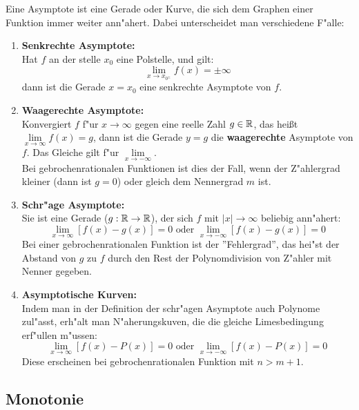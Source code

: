 \documentclass[main.tex]{subfiles}
\begin{document}
Eine Asymptote ist eine Gerade oder Kurve, die sich dem Graphen einer Funktion immer weiter ann"ahert. Dabei unterscheidet man verschiedene F"alle:\\
\begin{Definition}
\begin{enumerate}
	\item \textbf{Senkrechte Asymptote:}\\
	Hat $f$ an der stelle $x_{0}$ eine Polstelle, und gilt:
		$$\lim\limits_{x \rightarrow x_{0^{\pm}}} f(x) = \pm \infty$$
	dann ist die Gerade $x=x_{0}$ eine senkrechte Asymptote von $f$.

	\item \textbf{Waagerechte Asymptote:}\\
	Konvergiert $f$ f"ur $x\rightarrow \infty$ gegen eine reelle Zahl $g\in \mathbb{R}$, das heißt $\lim\limits_{x \rightarrow \infty }{f(x)}=g$, dann ist die Gerade $y=g$ die \textbf{waagerechte} Asymptote von $f$. Das Gleiche gilt f"ur $\lim\limits_{x \rightarrow -\infty}$.\\
	Bei gebrochenrationalen Funktionen ist dies der Fall, wenn der Z"ahlergrad kleiner (dann ist $g=0$) oder gleich dem Nennergrad $m$ ist.

	\item \textbf{Schr"age Asymptote:}\\
	Sie ist eine Gerade ($g:\mathbb{R} \rightarrow \mathbb{R}$), der sich $f$ mit $|x|\rightarrow \infty$ beliebig ann"ahert:
	$$\lim\limits_{x \rightarrow \infty}{[f(x)-g(x)]}=0 \text{ oder } \lim\limits_{x \rightarrow -\infty}{[f(x)-g(x)]}=0$$
	Bei einer gebrochenrationalen Funktion ist der ''Fehlergrad'', das hei"st der Abstand von $g$ zu $f$ durch den Rest der Polynomdivision von Z"ahler mit Nenner gegeben.

	\item \textbf{Asymptotische Kurven:}\\
	Indem man in der Definition der schr"agen Asymptote auch Polynome zul"asst, erh"alt man N"aherungskuven, die die gleiche Limesbedingung erf"ullen m"ussen:
	$$\lim\limits_{x \rightarrow \infty}{[f(x)-P(x)]}=0 \text{ oder } \lim\limits_{x \rightarrow -\infty}{[f(x)-P(x)]}=0$$
	Diese erscheinen bei gebrochenrationalen Funktion mit $n>m+1$.
\end{enumerate}
\end{Definition}

\subsection{Monotonie}
\end{document}
